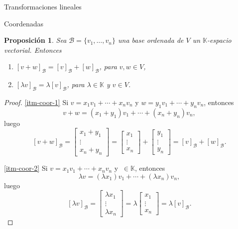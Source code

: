 \documentclass[a4paper,12pt,twoside,spanish,reqno]{amsbook}
\numberwithin{equation}{section}
\newtheorem{proposicion}[teorema]{Proposici\'on}
\theoremstyle{definition}
\theoremstyle{remark}
\newcommand{\K}{\mathbb K}
\begin{document}
\begin{chapter}{Transformaciones lineales}
\begin{section}{Coordenadas}
    \begin{proposicion}\label{vectorbase->lineal}
        Sea $\mathcal{B}=\{v_1,\ldots,v_n\}$ una base ordenada de $V$ un $\K$-espacio vectorial. Entonces
        \begin{enumerate}
            \item\label{itm-coor-1} $[v + w]_\mathcal{B} = [v]_\mathcal{B} +[w]_\mathcal{B}$, para $v,w \in V$,
            \item\label{itm-coor-2} $[\lambda v]_\mathcal{B} = \lambda[v]_\mathcal{B}$, para $\lambda \in \K$ y $v \in V$.
        \end{enumerate}
    \end{proposicion} 
    \begin{proof}
        \ref{itm-coor-1} Si $v = x_1v_1 + \cdots +x_nv_n$ y $w = y_1v_1 + \cdots +y_nv_n$, entonces 
        $$
        v + w = (x_1+y_1)v_1 + \cdots +(x_n+y_n)v_n,
        $$
        luego
        $$
        [v + w]_\mathcal{B} = \begin{bmatrix}x_1+y_1 \\ \vdots \\ x_n+y_n\end{bmatrix}
        = \begin{bmatrix}x_1 \\ \vdots \\ x_n\end{bmatrix}+\begin{bmatrix}y_1 \\ \vdots \\ y_n\end{bmatrix} = [v]_\mathcal{B} +[w]_\mathcal{B}.
        $$
        
        \ref{itm-coor-2} Si $v = x_1v_1 + \cdots +x_nv_n$ y $\ \in \K$, entonces 
        $$
        \lambda v = (\lambda x_1)v_1 + \cdots +(\lambda x_n)v_n,
        $$
        luego
        $$
        [\lambda v ]_\mathcal{B} = \begin{bmatrix}\lambda x_1 \\ \vdots \\ \lambda x_n\end{bmatrix}
        = \lambda \begin{bmatrix}x_1 \\ \vdots \\ x_n\end{bmatrix} = \lambda [v]_\mathcal{B}.
        $$
    \end{proof}
    

\end{section}
\end{chapter}
\end{document}
